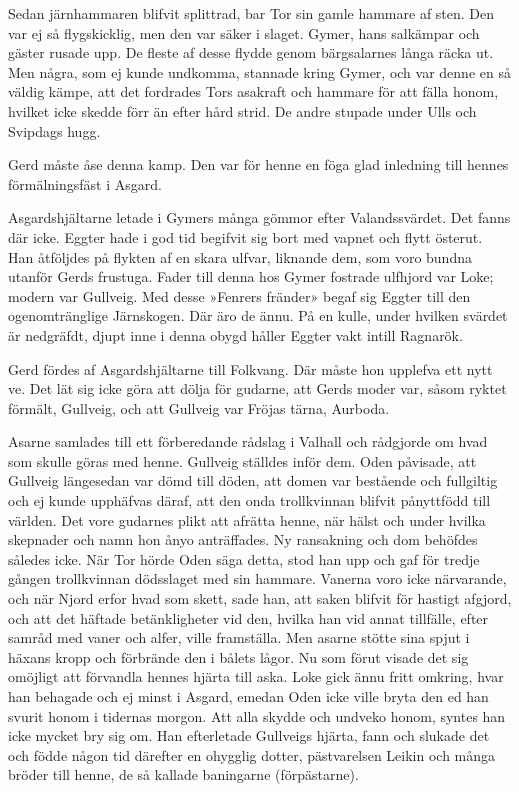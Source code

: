 Sedan järnhammaren blifvit splittrad, bar Tor sin gamle hammare af sten.
Den var ej så flygskicklig, men den var säker i slaget. Gymer, hans
salkämpar och gäster rusade upp. De fleste af desse flydde genom
bärgsalarnes långa räcka ut. Men några, som ej kunde undkomma, stannade
kring Gymer, och var denne en så väldig kämpe, att det fordrades Tors
asakraft och hammare för att fälla honom, hvilket icke skedde förr än
efter hård strid. De andre stupade under Ulls och Svipdags hugg.

Gerd måste åse denna kamp. Den var för henne en föga glad inledning till
hennes förmälningsfäst i Asgard.

Asgardshjältarne letade i Gymers många gömmor efter Valandssvärdet. Det
fanns där icke. Eggter hade i god tid begifvit sig bort med vapnet och
flytt österut. Han åtföljdes på flykten af en skara ulfvar, liknande
dem, som voro bundna utanför Gerds frustuga. Fader till denna hos Gymer
fostrade ulfhjord var Loke; modern var Gullveig. Med desse »Fenrers
fränder» begaf sig Eggter till den ogenomtränglige Järnskogen. Där äro
de ännu. På en kulle, under hvilken svärdet är nedgräfdt, djupt inne i
denna obygd håller Eggter vakt intill Ragnarök.





Gerd fördes af Asgardshjältarne till Folkvang. Där måste hon upplefva
ett nytt ve. Det lät sig icke göra att dölja för gudarne, att Gerds
moder var, såsom ryktet förmält, Gullveig, och att Gullveig var Fröjas
tärna, Aurboda.

Asarne samlades till ett förberedande rådslag i Valhall och rådgjorde om
hvad som skulle göras med henne. Gullveig ställdes inför dem. Oden
påvisade, att Gullveig längesedan var dömd till döden, att domen var
bestående och fullgiltig och ej kunde upphäfvas däraf, att den onda
trollkvinnan blifvit pånyttfödd till världen. Det vore gudarnes plikt
att afrätta henne, när hälst och under hvilka skepnader och namn hon
ånyo anträffades. Ny ransakning och dom behöfdes således icke. När Tor
hörde Oden säga detta, stod han upp och gaf för tredje gången
trollkvinnan dödsslaget med sin hammare. Vanerna voro icke närvarande,
och när Njord erfor hvad som skett, sade han, att saken blifvit för
hastigt afgjord, och att det häftade betänkligheter vid den, hvilka han
vid annat tillfälle, efter samråd med vaner och alfer, ville framställa.
Men asarne stötte sina spjut i häxans kropp och förbrände den i bålets
lågor. Nu som förut visade det sig omöjligt att förvandla hennes hjärta
till aska. Loke gick ännu fritt omkring, hvar han behagade och ej minst
i Asgard, emedan Oden icke ville bryta den ed han svurit honom i
tidernas morgon. Att alla skydde och undveko honom, syntes han icke
mycket bry sig om. Han efterletade Gullveigs hjärta, fann och slukade
det och födde någon tid därefter en ohygglig dotter, pästvarelsen Leikin
och många bröder till henne, de så kallade baningarne (förpästarne).


